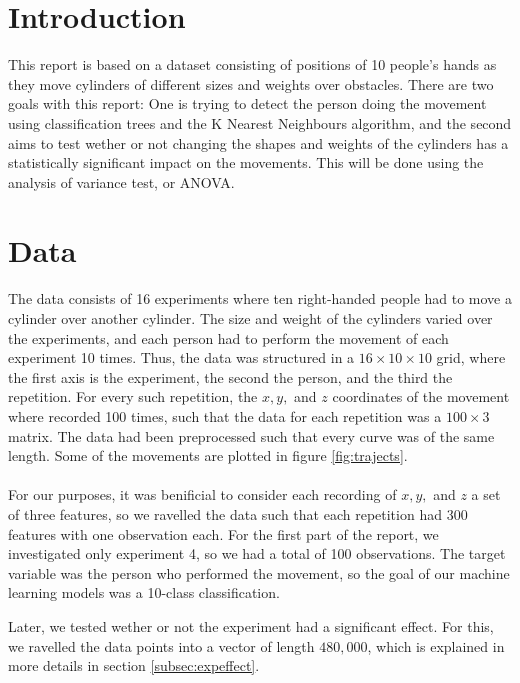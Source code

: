 \documentclass[11pt,fleqn]{article}
\title{}
\author{Asger Schultz}
\date{\today}
\begin{document}
\maketitle
\tableofcontents
\newpage 


\section{Introduction}
This report is based on a dataset consisting of positions of 10 people's hands as they move cylinders of different sizes and weights over obstacles.
There are two goals with this report: One is trying to detect the person doing the movement using classification trees and the K Nearest Neighbours algorithm, and the second aims to test wether or not changing the shapes and weights of the cylinders has a statistically significant impact on the movements.
This will be done using the analysis of variance test, or ANOVA.

\section{Data}
The data consists of 16 experiments where ten right-handed people had to move a cylinder over another cylinder.
The size and weight of the cylinders varied over the experiments, and each person had to perform the movement of each experiment 10 times.
Thus, the data was structured in a $ 16\times 10\times 10 $ grid, where the first axis is the experiment, the second the person, and the third the repetition.
For every such repetition, the $ x, y, $ and $ z $ coordinates of the movement where recorded 100 times, such that the data for each repetition was a $ 100\times 3 $ matrix.
The data had been preprocessed such that every curve was of the same length.
Some of the movements are plotted in figure \ref{fig:trajects}.\\
\\
For our purposes, it was benificial to consider each recording of $ x, y, $ and $ z $ a set of three features, so we ravelled the data such that each repetition had $ 300 $ features with one observation each.
For the first part of the report, we investigated only experiment 4, so we had a total of 100 observations.
The target variable was the person who performed the movement, so the goal of our machine learning models was a 10-class classification.

Later, we tested wether or not the experiment had a significant effect.
For this, we ravelled the data points into a vector of length $ 480,000 $, which is explained in more details in section \ref{subsec:expeffect}.
\end{document}
